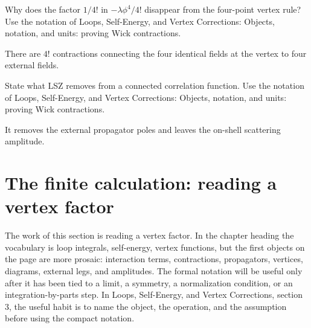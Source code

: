 \begin{exercise}
Why does the factor \(1/4!\) in \(-\lambda\phi^4/4!\) disappear from the four-point vertex rule?  Use the notation of Loops, Self-Energy, and Vertex Corrections: Objects, notation, and units: proving Wick contractions.
\begin{answer}
There are \(4!\) contractions connecting the four identical fields at the vertex to four external fields.
\end{answer}
\end{exercise}

\begin{exercise}
State what LSZ removes from a connected correlation function.  Use the notation of Loops, Self-Energy, and Vertex Corrections: Objects, notation, and units: proving Wick contractions.
\begin{answer}
It removes the external propagator poles and leaves the on-shell scattering amplitude.
\end{answer}
\end{exercise}



\section{The finite calculation: reading a vertex factor}













The work of this section is reading a vertex factor.  In the chapter heading the vocabulary is loop integrals, self-energy, vertex functions, but the first objects on the page are more prosaic: interaction terms, contractions, propagators, vertices, diagrams, external legs, and amplitudes.  The formal notation will be useful only after it has been tied to a limit, a symmetry, a normalization condition, or an integration-by-parts step.  In Loops, Self-Energy, and Vertex Corrections, section 3, the useful habit is to name the object, the operation, and the assumption before using the compact notation.

